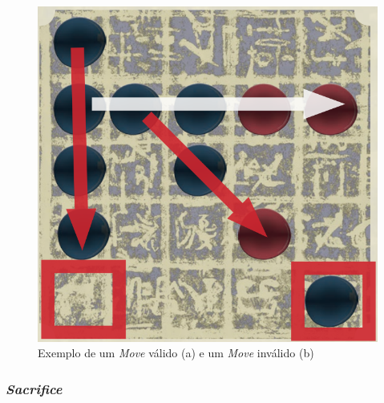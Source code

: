 \documentclass[a4paper]{article}
\begin{document}
\begin{figure}[!htb]
\centering
\includegraphics[scale=0.3]{push2.png} 
\caption{Exemplo de um \textit{Move} válido (a) e um \textit{Move} inválido (b)}
\end{figure}




\subsubsection{\textit{Sacrifice}}
\end{document}
